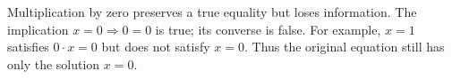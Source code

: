 Multiplication by zero preserves a true equality but loses information. The implication $x=0\Rightarrow0=0$ is true; its converse is false. For example, $x=1$ satisfies $0\cdot x=0$ but does not satisfy $x=0$. Thus the original equation still has only the solution $\boxed{x=0}$.
